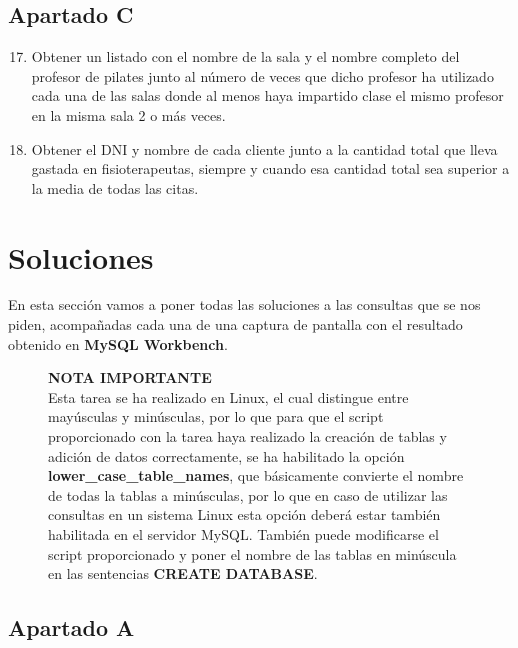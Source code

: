 \subsection{Apartado C}

\begin{enumerate}
    \setcounter{enumi}{16}
    \item Obtener un listado con el nombre de la sala y el nombre completo del profesor de pilates junto al número de veces que dicho profesor ha utilizado cada una de las salas donde al menos haya impartido clase el mismo profesor en la misma sala 2 o más veces.
    \item Obtener el DNI y nombre de cada cliente junto a la cantidad total que lleva gastada en fisioterapeutas, siempre y cuando esa cantidad total sea superior a la media de todas las citas.
\end{enumerate}

\section{Soluciones}
En esta sección vamos a poner todas las soluciones a las consultas que se nos piden, acompañadas cada una de una captura de pantalla con el resultado obtenido en \textbf{MySQL Workbench}.

\begin{figure}[H]
    \begin{tcolorbox}[sharp corners, colback=blue!30, colframe=white!20]
        \normalsize
\textbf{NOTA IMPORTANTE} \\


Esta tarea se ha realizado en Linux, el cual distingue entre mayúsculas y minúsculas, por lo que para que el script proporcionado con la tarea haya realizado la creación de tablas y adición de datos correctamente, se ha habilitado la opción \textbf{lower\_case\_table\_names}, que básicamente convierte el nombre de todas la tablas a minúsculas, por lo que en caso de utilizar las consultas en un sistema Linux esta opción deberá estar también habilitada en el servidor MySQL. También puede modificarse el script proporcionado y poner el nombre de las tablas en minúscula en las sentencias \textbf{CREATE DATABASE}.
    \end{tcolorbox}
\end{figure}

\subsection{Apartado A}



%
%

